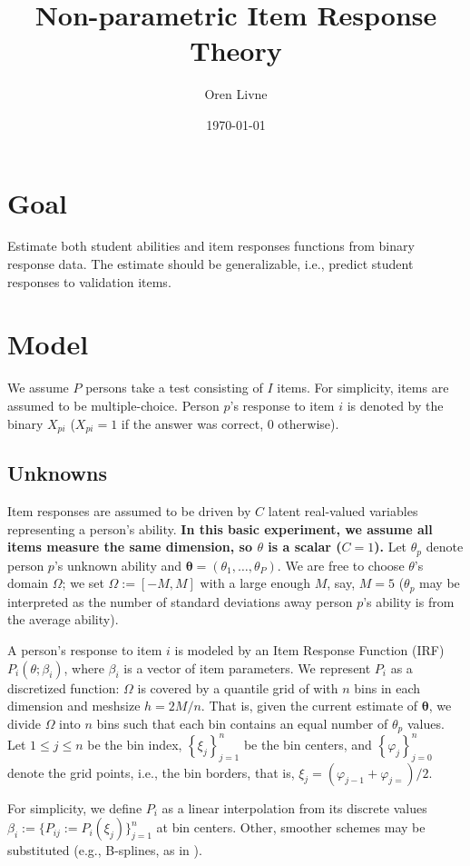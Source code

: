 \documentclass{article}
\title{Non-parametric Item Response Theory}
\author{Oren Livne}
\date{\today}
\newcommand{\bta}{\boldsymbol\ta}
\newcommand{\ta}{\theta}
\begin{document}
\maketitle

\section{Goal}
Estimate both student abilities and item responses functions from binary response data. The estimate should be generalizable, i.e., predict student responses to validation items.

\section{Model}
\label{model}
We assume $P$ persons take a test consisting of $I$ items. For simplicity, items are assumed to be multiple-choice. Person $p$'s response to item $i$ is denoted by the binary $X_{pi}$ ($X_{pi}=1$ if the answer was correct, $0$ otherwise).

\subsection{Unknowns}
Item responses are assumed to be driven by $C$ latent real-valued variables representing a person's ability. \textbf{In this basic experiment, we assume all items measure the same dimension, so $\ta$ is a scalar ($C=1$).} Let $\ta_p$ denote person $p$'s unknown ability and $\bta = (\ta_1,\dots,\ta_P)$. We are free to choose $\ta$'s domain $\Omega$; we set $\Omega := [-M, M]$ with a large enough $M$, say, $M = 5$ ($\ta_{p}$ may be interpreted as the number of standard deviations away person $p$'s ability is from the average ability).

A person's response to item $i$ is modeled by an Item Response Function (IRF) $P_i(\ta;\beta_i)$, where $\beta_i$ is a vector of item parameters. We represent $P_i$ as a discretized function: $\Omega$ is covered by a quantile grid of with $n$ bins in each dimension and meshsize $h = 2 M / n$. That is, given the current estimate of $\bta$, we divide $\Omega$ into $n$ bins such that each bin contains an equal number of $\theta_{p}$ values. Let $1 \leq j \leq n$ be the bin index, $\left\{\xi_{j} \right\}_{j=1}^n$ be the bin centers, and $\left\{\varphi_{j}\right\}_{j=0}^n$ denote the grid points, i.e., the bin borders, that is, $\xi_{j} = (\varphi_{j-1} + \varphi_{j=})/2$.

For simplicity, we define $P_i$ as a linear interpolation from its discrete values $\beta_i := \{P_{ij} := P_i(\xi_{j})\}_{j=1}^{n}$ at bin centers. Other, smoother schemes may be substituted (e.g., B-splines, as in \cite{matt_bsplines}).
\end{document}
